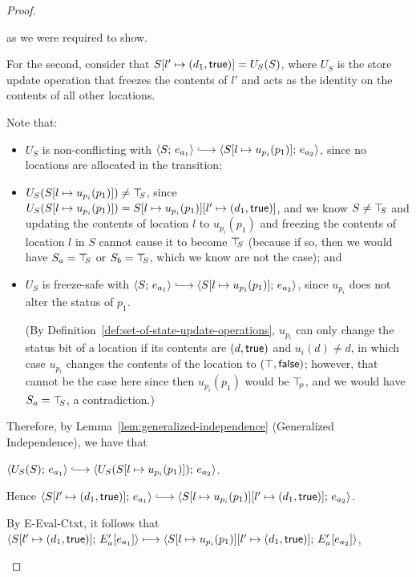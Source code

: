 \begin{proof}
\begin{enumerate}
\begin{enumerate}
\begin{itemize}
        as we were required to show.

        For the second, consider that
        $S[l' \mapsto (d_1, \textsf{true})] = U_S(S)$, where $U_S$ is
        the store update operation that freezes the contents of $l'$
        and acts as the identity on the contents of all other
        locations.

        Note that:
        \begin{itemize}
        \item $U_S$ is non-conflicting with $\config{S}{e_{a_1}}
          \parstepsto
          \config{\extSRaw{S}{l}{u_{p_i}(p_1)}}{e_{a_2}}$, since no
          locations are allocated in the transition;
        \item $U_S(S[l \mapsto u_{p_i}(p_1)]) \neq \top\hspace{-0.85mm}_{S}$, since
          $U_S(S[l \mapsto u_{p_i}(p_1)]) =
          S[l \mapsto u_{p_i}(p_1)][l' \mapsto (d_1, \textsf{true})]$,
          and we know $S \neq \top\hspace{-0.85mm}_{S}$ and updating the contents of
          location $l$ to $u_{p_i}(p_1)$ and freezing the contents
          of location $l$ in $S$ cannot cause it to become $\top\hspace{-0.85mm}_{S}$
          (because if so, then we would have $S_a = \top\hspace{-0.85mm}_{S}$ or $S_b =
          \top\hspace{-0.85mm}_{S}$, which we know are not the case); and
        \item $U_S$ is freeze-safe with $\config{S}{e_{a_1}}
          \parstepsto
          \config{\extSRaw{S}{l}{u_{p_i}(p_1)}}{e_{a_2}}$, since
          $u_{p_i}$ does not alter the status of $p_1$.

          (By Definition~\ref{def:set-of-state-update-operations},
          $u_{p_i}$ can only change the status bit of a location if
          its contents are $(d, \textsf{true})$ and $u_i(d) \neq
          d$, in which case $u_{p_i}$ changes the contents of the
          location to $(\top, \textsf{false})$; however, that
          cannot be the case here since then $u_{p_i}(p_1)$ would be
          $\top\hspace{-0.85mm}_{p}$, and we would have $S_a = \top\hspace{-0.85mm}_{S}$, a contradiction.)
        \end{itemize}
        Therefore, by Lemma~\ref{lem:generalized-independence}
        (Generalized Independence), we have that

        $\config{U_S(S)}{e_{a_1}} \parstepsto
        \config{U_S(\extSRaw{S}{l}{u_{p_i}(p_1)})}{e_{a_2}}$.

        Hence $\config{\extS{S}{l'}{d_1}{\frozentrue}}{e_{a_1}}
        \parstepsto
        \config{\extS{\extSRaw{S}{l}{u_{p_i}(p_1)}}{l'}{d_1}{\frozentrue}}{e_{a_2}}$.

        By {\sc E-Eval-Ctxt}, it follows that
        $\langle S[l' \mapsto (d_1, \textsf{true})];\, E'_a\hspace{-0.5mm}\left[e_{a_1}\right] \rangle
        \longmapsto
        \langle S[l \mapsto u_{p_i}(p_1)][l' \mapsto (d_1, \textsf{true})];\, E'_a\hspace{-0.5mm}\left[e_{a_2}\right] \rangle$,
        

\end{itemize}
\end{enumerate}
\end{enumerate}
\end{proof}
